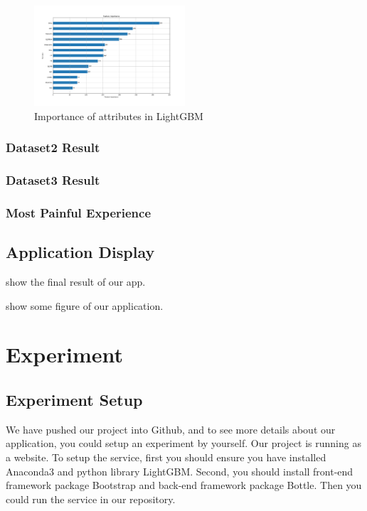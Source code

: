 \documentclass[letterpaper]{article} %
\begin{document}
\begin{figure}[!htbp]
\centering\includegraphics[width=0.5\textwidth]{dataset-1-impor}
\caption{Importance of attributes in LightGBM}
\label{fig:dataset-1-impor}
\end{figure}

\subsubsection{Dataset2 Result}

\subsubsection{Dataset3 Result}

\subsubsection{Most Painful Experience}

\subsection{Application Display}

show the final result of our app.

show some figure of our application.

\section{Experiment}

\subsection{Experiment Setup}
We have pushed our project into Github, and to see more details about our application, you could setup an experiment by yourself. Our project is running as a website. To setup the service, first you should ensure you have installed Anaconda3 and python library LightGBM. Second, you should install front-end framework package Bootstrap and back-end framework package Bottle. Then you could run the service in our repository.
\end{document}
